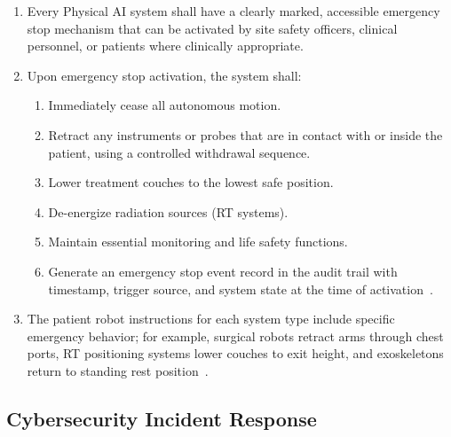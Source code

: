 \documentclass[11pt,letterpaper]{article}
\begin{document}
\begin{enumerate}[label=(\alph*)]
\item Every Physical AI system shall have a clearly marked, accessible emergency
  stop mechanism that can be activated by site safety officers, clinical
  personnel, or patients where clinically appropriate.

\item Upon emergency stop activation, the system shall:
  \begin{enumerate}[label=(\arabic*)]
  \item Immediately cease all autonomous motion.
  \item Retract any instruments or probes that are in contact with or
    inside the patient, using a controlled withdrawal sequence.
  \item Lower treatment couches to the lowest safe position.
  \item De-energize radiation sources (RT systems).
  \item Maintain essential monitoring and life safety functions.
  \item Generate an emergency stop event record in the audit trail with
    timestamp, trigger source, and system state at the time of
    activation~\cite{iche6r3adapt}.
  \end{enumerate}

\item The patient robot instructions for each system type include specific
  emergency behavior; for example, surgical robots retract arms through chest
  ports, RT positioning systems lower couches to exit height, and
  exoskeletons return to standing rest position~\cite{patientinstructions2026}.
\end{enumerate}

\subsection{Cybersecurity Incident Response}
\end{document}
